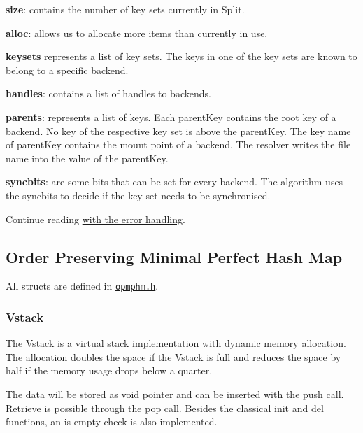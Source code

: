 \begin{DoxyItemize}
\item {\bfseries size}\+: contains the number of key sets currently in {\ttfamily Split}.
\item {\bfseries alloc}\+: allows us to allocate more items than currently in use.
\item {\bfseries keysets} represents a list of key sets. The keys in one of the key sets are known to belong to a specific backend.
\item {\bfseries handles}\+: contains a list of handles to backends.
\item {\bfseries parents}\+: represents a list of keys. Each {\ttfamily parent\+Key} contains the root key of a backend. No key of the respective key set is above the {\ttfamily parent\+Key}. The key name of {\ttfamily parent\+Key} contains the mount point of a backend. The resolver writes the file name into the value of the {\ttfamily parent\+Key}.
\item {\bfseries syncbits}\+: are some bits that can be set for every backend. The algorithm uses the {\ttfamily syncbits} to decide if the key set needs to be synchronised.
\end{DoxyItemize}

Continue reading \hyperlink{md_doc_help_elektra-error-handling_doc_help_elektra-error-handling_md}{with the error handling}.

\subsection*{Order Preserving Minimal Perfect Hash Map}

All structs are defined in \href{/home/markus/Projekte/Elektra/current/src/include/kdbopmphm.h}{\tt opmphm.\+h}.

\subsubsection*{Vstack}

The {\ttfamily Vstack} is a virtual stack implementation with dynamic memory allocation. The allocation doubles the space if the {\ttfamily Vstack} is full and reduces the space by half if the memory usage drops below a quarter.

The data will be stored as void pointer and can be inserted with the push call. Retrieve is possible through the pop call. Besides the classical init and del functions, an is-\/empty check is also implemented.

